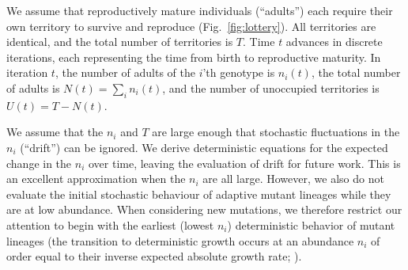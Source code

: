 \documentclass[11pt]{article}
\begin{document}
We assume that reproductively mature individuals (``adults'') each require their own territory to survive and reproduce (Fig.~\ref{fig:lottery}). All territories are identical, and the total number of territories is $T$. Time $t$ advances in discrete iterations, each representing the time from birth to reproductive maturity. In iteration $t$, the number of adults of the $i$'th genotype is $n_i(t)$, the total number of adults is $N(t)=\sum_i n_i(t)$, and the number of unoccupied territories is $U(t)=T-N(t)$. 

We assume that the $n_i$ and $T$ are large enough that stochastic fluctuations in the $n_i$ (``drift'') can be ignored. We derive deterministic equations for the expected change in the $n_i$ over time, leaving the evaluation of drift for future work. This is an excellent approximation when the $n_i$ are all large. However, we also do not evaluate the initial stochastic behaviour of adaptive mutant lineages while they are at low abundance. When considering new mutations, we therefore restrict our attention to begin with the earliest (lowest $n_i$) deterministic behavior of mutant lineages (the transition to deterministic growth occurs at an abundance $n_i$ of order equal to their inverse expected absolute growth rate; \citealt{uecker_2011}).
\end{document}
